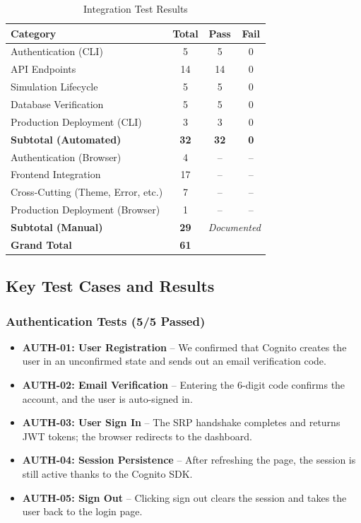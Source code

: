 \documentclass[11pt,a4paper]{article}
\newcommand{\cmark}{\textcolor{UNBGreen}{\ding{51}}}
\begin{document}
\begin{table}[H]
\centering
\begin{tabular}{lccc}
\toprule
\textbf{Category} & \textbf{Total} & \textbf{Pass} & \textbf{Fail} \\
\midrule
Authentication (CLI) & 5 & 5 & 0 \\
API Endpoints & 14 & 14 & 0 \\
Simulation Lifecycle & 5 & 5 & 0 \\
Database Verification & 5 & 5 & 0 \\
Production Deployment (CLI) & 3 & 3 & 0 \\
\midrule
\textbf{Subtotal (Automated)} & \textbf{32} & \textbf{32} & \textbf{0} \\
\midrule
Authentication (Browser) & 4 & -- & -- \\
Frontend Integration & 17 & -- & -- \\
Cross-Cutting (Theme, Error, etc.) & 7 & -- & -- \\
Production Deployment (Browser) & 1 & -- & -- \\
\midrule
\textbf{Subtotal (Manual)} & \textbf{29} & \multicolumn{2}{c}{\textit{Documented}} \\
\midrule
\textbf{Grand Total} & \textbf{61} & & \\
\bottomrule
\end{tabular}
\caption{Integration Test Results}
\label{tab:test-results}
\end{table}

\subsection{Key Test Cases and Results}

\subsubsection{Authentication Tests (5/5 Passed)}

\begin{itemize}[leftmargin=2em]
    \item \textbf{AUTH-01: User Registration} -- We confirmed that Cognito creates the user in an unconfirmed state and sends out an email verification code. \cmark
    \item \textbf{AUTH-02: Email Verification} -- Entering the 6-digit code confirms the account, and the user is auto-signed in. \cmark
    \item \textbf{AUTH-03: User Sign In} -- The SRP handshake completes and returns JWT tokens; the browser redirects to the dashboard. \cmark
    \item \textbf{AUTH-04: Session Persistence} -- After refreshing the page, the session is still active thanks to the Cognito SDK. \cmark
    \item \textbf{AUTH-05: Sign Out} -- Clicking sign out clears the session and takes the user back to the login page. \cmark
\end{itemize}
\end{document}
